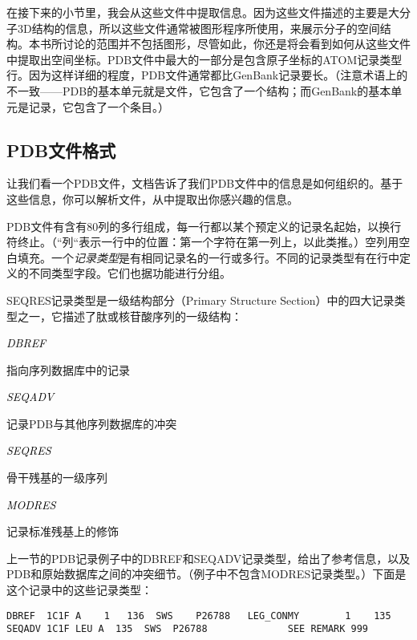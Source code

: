 在接下来的小节里，我会从这些文件中提取信息。因为这些文件描述的主要是大分子3D结构的信息，所以这些文件通常被图形程序所使用，来展示分子的空间结构。本书所讨论的范围并不包括图形，尽管如此，你还是将会看到如何从这些文件中提取出空间坐标。PDB文件中最大的一部分是包含原子坐标的ATOM记录类型行。因为这样详细的程度，PDB文件通常都比GenBank记录要长。（注意术语上的不一致——PDB的基本单元就是文件，它包含了一个结构；而GenBank的基本单元是记录，它包含了一个条目。）

\subsection{PDB文件格式}
让我们看一个PDB文件，文档告诉了我们PDB文件中的信息是如何组织的。基于这些信息，你可以解析文件，从中提取出你感兴趣的信息。

PDB文件有含有80列的多行组成，每一行都以某个预定义的记录名起始，以换行符终止。（“列“表示一行中的位置：第一个字符在第一列上，以此类推。）空列用空白填充。一个\textit{记录类型}是有相同记录名的一行或多行。不同的记录类型有在行中定义的不同类型字段。它们也据功能进行分组。

SEQRES记录类型是一级结构部分（Primary Structure Section）中的四大记录类型之一，它描述了肽或核苷酸序列的一级结构：

\textcolor{black}{\textit{DBREF}}
\begin{adjustwidth}{4em}{}
指向序列数据库中的记录
\end{adjustwidth}

\textcolor{black}{\textit{SEQADV}}
\begin{adjustwidth}{4em}{}
记录PDB与其他序列数据库的冲突
\end{adjustwidth}

\textcolor{black}{\textit{SEQRES}}
\begin{adjustwidth}{4em}{}
骨干残基的一级序列
\end{adjustwidth}

\textcolor{black}{\textit{MODRES}}
\begin{adjustwidth}{4em}{}
记录标准残基上的修饰
\end{adjustwidth}

上一节的PDB记录例子中的DBREF和SEQADV记录类型，给出了参考信息，以及PDB和原始数据库之间的冲突细节。（例子中不包含MODRES记录类型。）下面是这个记录中的这些记录类型：

\begin{lstlisting}
DBREF  1C1F A    1   136  SWS    P26788   LEG_CONMY        1    135             
SEQADV 1C1F LEU A  135  SWS  P26788              SEE REMARK 999 
\end{lstlisting}

